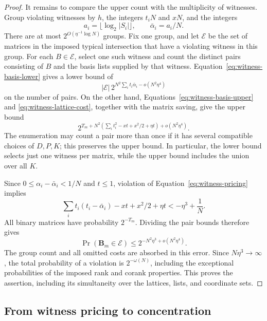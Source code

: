 \begin{proof}
It remains to compare the upper count with the multiplicity of
witnesses. Group violating witnesses by \(h\), the integers \(t_iN\)
and \(xN\), and the integers
\[
 a_i=\lfloor\log_2|S_i|\rfloor,\qquad \bar\alpha_i=a_i/N.
\]
There are at most \(2^{O(\eta^{-1}\log N)}\) groups. Fix one group,
and let \(\mathcal E\) be the set of matrices in the imposed typical
intersection that have a violating witness in this group. For each
\(B\in\mathcal E\), select one such witness and count the distinct
pairs consisting of \(B\) and the basis lists supplied by that
witness. Equation~\eqref{eq:witness-basis-lower} gives a lower bound
of
\[
 |\mathcal E|\,
 2^{N^2\sum_i t_i\bar\alpha_i-o(N^2\eta^4)}
\]
on the number of pairs. On the other hand,
Equations~\eqref{eq:witness-basis-upper} and
\eqref{eq:witness-lattice-cost}, together with the matrix saving,
give the upper bound
\[
 2^{T_m+
 N^2\left(\sum_i t_i^2-xt+x^2/2+\eta t\right)
 +o(N^2\eta^4)}.
\]
The enumeration may count a pair more than once if it has several
compatible choices of \(D,P,K\); this preserves the upper bound.
In particular, the lower bound selects just one witness per matrix,
while the upper bound includes the union over all \(K\).

Since \(0\le\alpha_i-\bar\alpha_i<1/N\) and \(t\le1\), violation of
Equation~\eqref{eq:witness-pricing} implies
\[
 \sum_i t_i(t_i-\bar\alpha_i)-xt+x^2/2+\eta t
 <-\eta^3+\frac1N.
\]
All binary matrices have probability \(2^{-T_m}\). Dividing the pair
bounds therefore gives
\[
 \Pr(\mathbf B_m\in\mathcal E)
 \le 2^{-N^2\eta^3+o(N^2\eta^4)}.
\]
The group count and all omitted costs are absorbed in this error.
Since \(N\eta^3\to\infty\), the total probability of a violation is
\(2^{-\omega(N)}\), including the exceptional probabilities of the
imposed rank and corank properties. This proves the assertion, including its
simultaneity over the lattices, lists, and coordinate sets.
\end{proof}

\subsection{From witness pricing to concentration}

